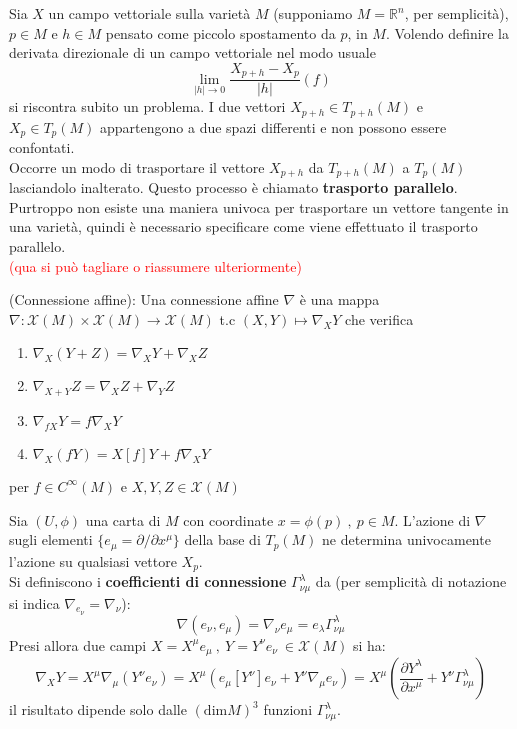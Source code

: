 Sia $X$ un campo vettoriale sulla varietà $M$ (supponiamo $M = \mathbb{R}^n$,
per semplicità), $p \in M$ e $h \in M$ pensato come piccolo spostamento da $p$, in $M$.
Volendo definire la derivata direzionale di un campo vettoriale nel modo usuale
$$
   \lim_{|h| \to 0} \frac{X_{p+h}-X_p}{|h|}(f)
$$
si riscontra subito un problema. I due vettori $X_{p+h} \in T_{p+h}(M)$ e
$X_p \in T_p(M)$ appartengono a due spazi differenti e non possono essere confontati.\\
Occorre un modo di trasportare il vettore $X_{p+h}$ da $T_{p+h}(M)$ a $T_p(M)$
lasciandolo inalterato. Questo processo è chiamato \textbf{trasporto parallelo}.
Purtroppo non esiste una maniera univoca per trasportare un vettore tangente in
una varietà, quindi è necessario specificare come viene effettuato il trasporto
parallelo.\\

\textcolor{red}{(qua si può tagliare o riassumere ulteriormente)}
\begin{definition}{(Connessione affine):}\label{def:affineconnection}
   Una connessione affine $\nabla$ è una mappa $\nabla : \mathcal{X}(M) \times
   \mathcal{X}(M)\to \mathcal{X}(M)$ t.c $(X,Y) \mapsto \nabla_X Y$ che verifica
   \begin{enumerate}
      \item $ \nabla_X (Y+Z) = \nabla_X Y + \nabla_X Z $
      \item $ \nabla_{X+Y} Z = \nabla_X Z + \nabla_Y Z $
      \item $ \nabla_{fX} Y = f\nabla_X Y $
      \item $ \nabla_X (fY) = X[f] Y + f\nabla_X Y $
   \end{enumerate}
   per $f \in C^\infty(M)$ e $X,Y,Z \in \mathcal{X}(M)$
\end{definition}

Sia $(U,\phi)$ una carta di $M$ con coordinate $x = \phi(p) \:,\: p\in M$.
L'azione di $\nabla$ sugli elementi $\{ e_\mu = \partial/ \partial x^\mu \}$
della base di $T_p(M)$ ne determina univocamente l'azione su qualsiasi vettore $X_p$.\\

Si definiscono i \textbf{coefficienti di connessione} $\Gamma^\lambda_{\nu\mu}$ da
(per semplicità di notazione si indica $\nabla_{e_\nu} = \nabla_\nu$):
$$
   \nabla (e_\nu,e_\mu) = \nabla_\nu e_\mu =
      e_\lambda \Gamma^\lambda_{\nu\mu}
$$
Presi allora due campi $X = X^\mu e_\mu \: , \: Y = Y^\nu e_\nu \:
\in \mathcal{X}(M)$ si ha:
$$
   \nabla_X Y
      = X^\mu \nabla_\mu(Y^\nu e_\nu)
      = X^\mu(e_\mu[Y^\nu]e_\nu + Y^\nu \nabla_\mu e_\nu)
      = X^\mu \left(\frac{\partial Y^\lambda }{\partial x^\mu}
         + Y^\nu \Gamma^\lambda_{\nu\mu} \right)
$$
il risultato dipende solo dalle $(\mathrm{dim} M)^3$ funzioni $\Gamma^\lambda_{\nu\mu}$.\\

